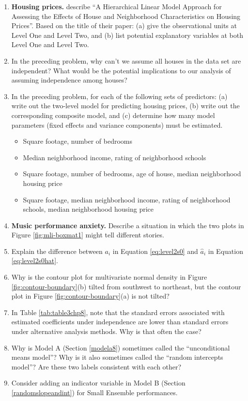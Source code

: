 \documentclass[
]{krantz}
\providecommand{\tightlist}{%
  \setlength{\itemsep}{0pt}\setlength{\parskip}{0pt}}
\begin{document}
\begin{enumerate}
\def\labelenumi{\arabic{enumi}.}
\item
  \textbf{Housing prices.} \citet{Brown2004} describe ``A Hierarchical Linear Model Approach for Assessing the Effects of House and Neighborhood Characteristics on Housing Prices''. Based on the title of their paper: (a) give the observational units at Level One and Level Two, and (b) list potential explanatory variables at both Level One and Level Two.
\item
  In the preceding problem, why can't we assume all houses in the data set are independent? What would be the potential implications to our analysis of assuming independence among houses?
\item
  In the preceding problem, for each of the following sets of predictors: (a) write out the two-level model for predicting housing prices, (b) write out the corresponding composite model, and (c) determine how many model parameters (fixed effects and variance components) must be estimated.

  \begin{itemize}
  \tightlist
  \item
    Square footage, number of bedrooms
  \item
    Median neighborhood income, rating of neighborhood schools
  \item
    Square footage, number of bedrooms, age of house, median neighborhood housing price
  \item
    Square footage, median neighborhood income, rating of neighborhood schools, median neighborhood housing price
  \end{itemize}
\item
  \textbf{Music performance anxiety.} Describe a situation in which the two plots in Figure \ref{fig:mli-boxmat1} might tell different stories.
\item
  Explain the difference between \(a_{i}\) in Equation \eqref{eq:level2s0} and \(\hat{a}_{i}\) in Equation \eqref{eq:level2s0hat}.
\item
  Why is the contour plot for multivariate normal density in Figure \ref{fig:contour-boundary}(b) tilted from southwest to northeast, but the contour plot in Figure \ref{fig:contour-boundary}(a) is not tilted?
\item
  In Table \ref{tab:table3chp8}, note that the standard errors associated with estimated coefficients under independence are lower than standard errors under alternative analysis methods. Why is that often the case?
\item
  Why is Model A (Section \ref{modela8}) sometimes called the ``unconditional means model''? Why is it also sometimes called the ``random intercepts model''? Are these two labels consistent with each other?
\item
  Consider adding an indicator variable in Model B (Section \ref{randomslopeandint}) for Small Ensemble performances.


\end{enumerate}
\end{document}
